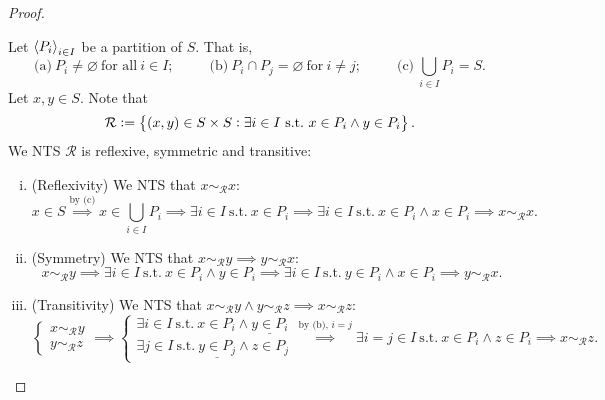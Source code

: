 \documentclass[11pt,openany]{article}
\begin{document}
\newpage
{}
\begin{proof}
	\textcolor{gray!30!white}{Let $\left\langle P_i \right\rangle_{i\in I}$ be a partition of $S$. That is, \[
	\text{(a)}\ P_i\neq\varnothing\ \text{for all}\ i\in I;\hspace{30pt}
	\text{(b)}\ P_i\cap P_j=\varnothing\ \text{for}\ i\neq j;\hspace{30pt}
	\text{(c)}\ \bigcup_{i\in I}P_i=S.
	\]
	Let $x,y\in S$. Note that \[
	\mathcal{R}:=\set{(x,y)\in S\times S: \exists i\in I\ \text{s.t.}\ x\in P_i\land y\in P_i}.
	\]We NTS $\mathcal{R}$ is reflexive, symmetric and transitive:
	\begin{enumerate}[(i)]
		\item (Reflexivity) We NTS that $x\sim_{\mathcal{R}} x$: \[
		x\in S\overset{\text{by (c)}}{\implies} x\in \bigcup_{i\in I}P_i\implies \exists i\in I\ \text{s.t.}\ x\in P_i\implies \exists i\in I\ \text{s.t.}\ x\in P_i\land x\in P_i\implies x\sim_{\mathcal{R}} x.
		\]
		\item (Symmetry) We NTS that $x\sim_{\mathcal{R}} y\implies y\sim_{\mathcal{R}} x$:\[
		x\sim_{\mathcal{R}} y\implies \exists i\in I\ \text{s.t.}\ x\in P_i\land y\in P_i\implies \exists i\in I\ \text{s.t.}\ y\in P_i\land x\in P_i\implies y\sim_{\mathcal{R}} x.
		\]
		\item (Transitivity) We NTS that $x\sim_{\mathcal{R}} y\land y\sim_{\mathcal{R}} z\implies x\sim_{\mathcal{R}} z$:\[
		\begin{cases*}
			x\sim_{\mathcal{R}} y \\
			y\sim_{\mathcal{R}} z
		\end{cases*}\implies \begin{cases*}
		\exists i\in I\ \text{s.t.}\ x\in P_i\land \underline{y\in P_i} \\
		\exists j\in I\ \text{s.t.}\ \underline{y\in P_j}\land z\in P_j
	\end{cases*}\overset{\text{by (b), $i=j$}}{\implies}\exists i=j\in I\ \text{s.t.}\ x\in P_i\land z\in P_i\implies x\sim_{\mathcal{R}} z.
		\]
	\end{enumerate}}
\end{proof}
\end{document}
